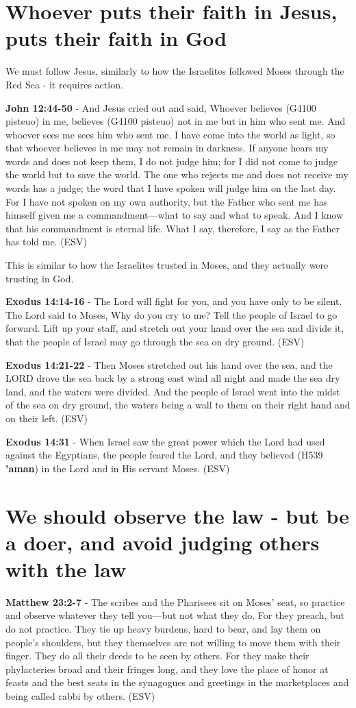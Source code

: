 \documentclass[11pt]{article}
\begin{document}
\section{Whoever puts their faith in Jesus, puts their faith in God}
\label{sec:orgc95902d}
We must follow Jesus, similarly to how the Israelites followed Moses through the Red Sea - it requires action.

\textbf{John 12:44-50} - And Jesus cried out and said, Whoever believes (G4100 pisteuo) in me, believes (G4100 pisteuo) not in me but in him who sent me.  And whoever sees me sees him who sent me.  I have come into the world as light, so that whoever believes in me may not remain in darkness.  If anyone hears my words and does not keep them, I do not judge him; for I did not come to judge the world but to save the world.  The one who rejects me and does not receive my words has a judge; the word that I have spoken will judge him on the last day.  For I have not spoken on my own authority, but the Father who sent me has himself given me a commandment—what to say and what to speak.  And I know that his commandment is eternal life.  What I say, therefore, I say as the Father has told me. (ESV)

This is similar to how the Israelites trusted in Moses, and they actually were trusting in God.

\textbf{Exodus 14:14-16} - The Lord will fight for you, and you have only to be silent.  The Lord said to Moses, Why do you cry to me? Tell the people of Israel to go forward.  Lift up your staff, and stretch out your hand over the sea and divide it, that the people of Israel may go through the sea on dry ground. (ESV)

\textbf{Exodus 14:21-22} - Then Moses stretched out his hand over the sea, and the LORD drove the sea back by a strong east wind all night and made the sea dry land, and the waters were divided. And the people of Israel went into the midst of the sea on dry ground, the waters being a wall to them on their right hand and on their left. (ESV)

\textbf{Exodus 14:31} - When Israel saw the great power which the Lord had used against the Egyptians, the people feared the Lord, and they believed (H539 \textbf{'aman}) in the Lord and in His servant Moses. (ESV)

\section{We should observe the law - but be a doer, and avoid judging others with the law}
\label{sec:org3deec45}
\textbf{Matthew 23:2-7} - The scribes and the Pharisees sit on Moses' seat, so practice and observe whatever they tell you—but not what they do. For they preach, but do not practice. They tie up heavy burdens, hard to bear, and lay them on people's shoulders, but they themselves are not willing to move them with their finger. They do all their deeds to be seen by others. For they make their phylacteries broad and their fringes long, and they love the place of honor at feasts and the best seats in the synagogues and greetings in the marketplaces and being called rabbi by others. (ESV)
\end{document}
